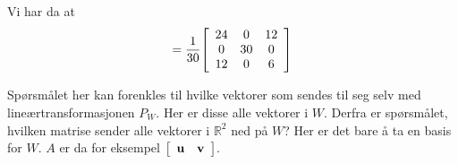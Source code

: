 \documentclass[11pt, a4paper, norsk]{NTNUoving}
\newenvironment{pkt}{\begin{punkt}}{\end{punkt}}
\newenvironment{matrise}[1][c]{
        \left[
            \begin{array}{#1}
    }
    {    
    \end{array}
    \right]           
}
\newcommand{\R}{\mathbb{R}}
\begin{document}
\begin{oppgave}
\begin{pkt}
        Vi har da at 
        \begin{align*}
            [P_W]=\frac{1}{30}\begin{matrise}[ccc]
                24&0&12\\0&30&0\\12&0&6
            \end{matrise}
        \end{align*}
    \end{pkt}
    \begin{pkt}
        Spørsmålet her kan forenkles til hvilke vektorer som sendes til seg selv med lineærtransformasjonen $P_W$. Her er disse alle vektorer i $W$. Derfra er spørsmålet, hvilken matrise sender alle vektorer i $\R^2$ ned på $W$? Her er det bare å ta en basis for $W$. $A$ er da for eksempel $\begin{matrise}[cc]
        \textbf{u} & \textbf{v}
        \end{matrise}$.
    \end{pkt}
\end{oppgave}
\end{document}
